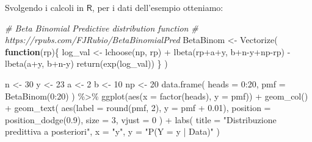 \documentclass[
]{memoir}
\newenvironment{Shaded}{\begin{snugshade}}{\end{snugshade}}
\newcommand{\AttributeTok}[1]{\textcolor[rgb]{0.77,0.63,0.00}{#1}}
\newcommand{\CommentTok}[1]{\textcolor[rgb]{0.56,0.35,0.01}{\textit{#1}}}
\newcommand{\ControlFlowTok}[1]{\textcolor[rgb]{0.13,0.29,0.53}{\textbf{#1}}}
\newcommand{\DecValTok}[1]{\textcolor[rgb]{0.00,0.00,0.81}{#1}}
\newcommand{\FloatTok}[1]{\textcolor[rgb]{0.00,0.00,0.81}{#1}}
\newcommand{\FunctionTok}[1]{\textcolor[rgb]{0.00,0.00,0.00}{#1}}
\newcommand{\NormalTok}[1]{#1}
\newcommand{\OtherTok}[1]{\textcolor[rgb]{0.56,0.35,0.01}{#1}}
\newcommand{\SpecialCharTok}[1]{\textcolor[rgb]{0.00,0.00,0.00}{#1}}
\newcommand{\StringTok}[1]{\textcolor[rgb]{0.31,0.60,0.02}{#1}}
\newcommand{\R}{\textsf{R}} %
\theoremstyle{definition}
\theoremstyle{definition}
\theoremstyle{definition}
\theoremstyle{definition}
\theoremstyle{remark}
\begin{document}
Svolgendo i calcoli in \(\R\), per i dati dell'esempio otteniamo:

\begin{Shaded}
\begin{Highlighting}[]
\CommentTok{\# Beta Binomial Predictive distribution function}
\CommentTok{\# https://rpubs.com/FJRubio/BetaBinomialPred}
\NormalTok{BetaBinom }\OtherTok{\textless{}{-}} \FunctionTok{Vectorize}\NormalTok{(}
  \ControlFlowTok{function}\NormalTok{(rp)\{}
\NormalTok{  log\_val }\OtherTok{\textless{}{-}} \FunctionTok{lchoose}\NormalTok{(np, rp) }\SpecialCharTok{+} 
    \FunctionTok{lbeta}\NormalTok{(rp}\SpecialCharTok{+}\NormalTok{a}\SpecialCharTok{+}\NormalTok{y, b}\SpecialCharTok{+}\NormalTok{n}\SpecialCharTok{{-}}\NormalTok{y}\SpecialCharTok{+}\NormalTok{np}\SpecialCharTok{{-}}\NormalTok{rp) }\SpecialCharTok{{-}} 
    \FunctionTok{lbeta}\NormalTok{(a}\SpecialCharTok{+}\NormalTok{y, b}\SpecialCharTok{+}\NormalTok{n}\SpecialCharTok{{-}}\NormalTok{y)}
  \FunctionTok{return}\NormalTok{(}\FunctionTok{exp}\NormalTok{(log\_val))}
\NormalTok{  \}}
\NormalTok{)}

\NormalTok{n }\OtherTok{\textless{}{-}} \DecValTok{30}
\NormalTok{y }\OtherTok{\textless{}{-}} \DecValTok{23}
\NormalTok{a }\OtherTok{\textless{}{-}} \DecValTok{2}
\NormalTok{b }\OtherTok{\textless{}{-}} \DecValTok{10}
\NormalTok{np }\OtherTok{\textless{}{-}} \DecValTok{20}
\FunctionTok{data.frame}\NormalTok{(}
  \AttributeTok{heads =} \DecValTok{0}\SpecialCharTok{:}\DecValTok{20}\NormalTok{, }
  \AttributeTok{pmf =} \FunctionTok{BetaBinom}\NormalTok{(}\DecValTok{0}\SpecialCharTok{:}\DecValTok{20}\NormalTok{)}
\NormalTok{) }\SpecialCharTok{\%\textgreater{}\%}
\FunctionTok{ggplot}\NormalTok{(}\FunctionTok{aes}\NormalTok{(}\AttributeTok{x =} \FunctionTok{factor}\NormalTok{(heads), }\AttributeTok{y =}\NormalTok{ pmf)) }\SpecialCharTok{+}
  \FunctionTok{geom\_col}\NormalTok{() }\SpecialCharTok{+}
  \FunctionTok{geom\_text}\NormalTok{(}
    \FunctionTok{aes}\NormalTok{(}\AttributeTok{label =} \FunctionTok{round}\NormalTok{(pmf, }\DecValTok{2}\NormalTok{), }\AttributeTok{y =}\NormalTok{ pmf }\SpecialCharTok{+} \FloatTok{0.01}\NormalTok{),}
    \AttributeTok{position =} \FunctionTok{position\_dodge}\NormalTok{(}\FloatTok{0.9}\NormalTok{),}
    \AttributeTok{size =} \DecValTok{3}\NormalTok{,}
    \AttributeTok{vjust =} \DecValTok{0}
\NormalTok{  ) }\SpecialCharTok{+}
  \FunctionTok{labs}\NormalTok{(}
    \AttributeTok{title =} \StringTok{"Distribuzione predittiva a posteriori"}\NormalTok{,}
    \AttributeTok{x =} \StringTok{"y\textquotesingle{}"}\NormalTok{,}
    \AttributeTok{y =} \StringTok{"P(Y = y\textquotesingle{} | Data)"}
\NormalTok{  ) }
\end{Highlighting}
\end{Shaded}
\end{document}
